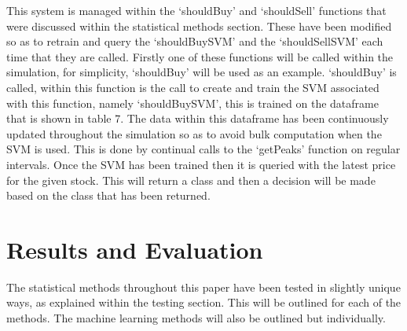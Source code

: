 \documentclass[conference]{IEEEtran}
\begin{document}
This system is managed within the `shouldBuy' and `shouldSell' functions that were discussed within the statistical methods section. These have been modified so as to retrain and query the `shouldBuySVM' and the `shouldSellSVM' each time that they are called. Firstly one of these functions will be called within the simulation, for simplicity, `shouldBuy' will be used as an example. `shouldBuy' is called, within this function is the call to create and train the SVM associated with this function, namely `shouldBuySVM', this is trained on the dataframe that is shown in table 7. The data within this dataframe has been continuously updated throughout the simulation so as to avoid bulk computation when the SVM is used. This is done by continual calls to the `getPeaks' function on regular intervals. Once the SVM has been trained then it is queried with the latest price for the given stock. This will return a class and then a decision will be made based on the class that has been returned.

\iffalse
#################################################################################
\fi

\section{Results and Evaluation}

\iffalse
this section presents the results of the solutions.  It should include information on experimental settings.  The results should demonstrate the claimed benefits/disadvantages of the proposed solutions.
This section should be between 2 to 3 pages in length.

- Testing Criteria for each of the stat methods\\
- decision criteria for each of the peak trough methods\\
- input variables for the SVM - kernal etc \\
- conjunction test criteria for each of the good stat methods\\
- best stat method result possible\\
- best ml method result possible

This section should between 1 to 2 pages in length.
\fi

The statistical methods throughout this paper have been tested in slightly unique ways, as explained within the testing section. This will be outlined for each of the methods. The machine learning methods will also be outlined but individually.\\
\end{document}
